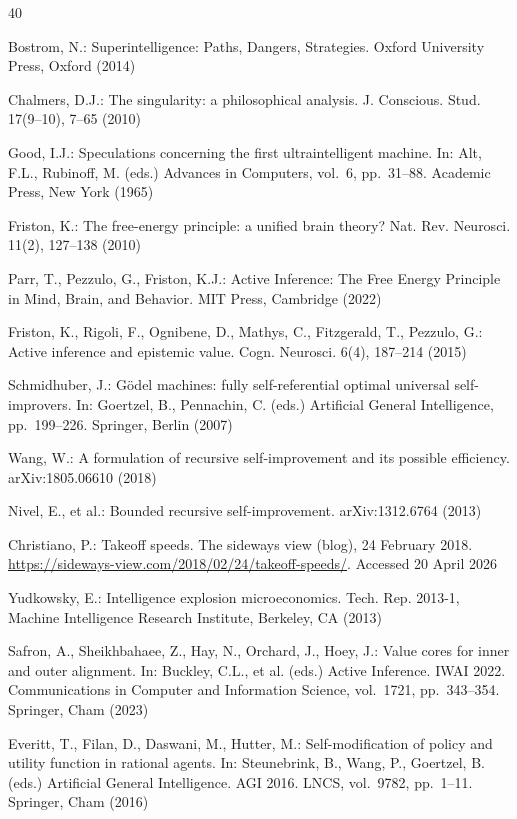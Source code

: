 \documentclass[runningheads]{llncs}
\begin{document}
\begin{thebibliography}{40}

Bostrom, N.: Superintelligence: Paths, Dangers, Strategies. Oxford University Press, Oxford (2014)

Chalmers, D.J.: The singularity: a philosophical analysis. J. Conscious. Stud. 17(9--10), 7--65 (2010)

Good, I.J.: Speculations concerning the first ultraintelligent machine. In: Alt, F.L., Rubinoff, M. (eds.) Advances in Computers, vol.~6, pp.~31--88. Academic Press, New York (1965)

Friston, K.: The free-energy principle: a unified brain theory? Nat. Rev. Neurosci. 11(2), 127--138 (2010)

Parr, T., Pezzulo, G., Friston, K.J.: Active Inference: The Free Energy Principle in Mind, Brain, and Behavior. MIT Press, Cambridge (2022)

Friston, K., Rigoli, F., Ognibene, D., Mathys, C., Fitzgerald, T., Pezzulo, G.: Active inference and epistemic value. Cogn. Neurosci. 6(4), 187--214 (2015)

Schmidhuber, J.: G\"odel machines: fully self-referential optimal universal self-improvers. In: Goertzel, B., Pennachin, C. (eds.) Artificial General Intelligence, pp.~199--226. Springer, Berlin (2007)

Wang, W.: A formulation of recursive self-improvement and its possible efficiency. arXiv:1805.06610 (2018)

Nivel, E., et al.: Bounded recursive self-improvement. arXiv:1312.6764 (2013)

Christiano, P.: Takeoff speeds. The sideways view (blog), 24 February 2018. \url{https://sideways-view.com/2018/02/24/takeoff-speeds/}. Accessed 20 April 2026

Yudkowsky, E.: Intelligence explosion microeconomics. Tech. Rep. 2013-1, Machine Intelligence Research Institute, Berkeley, CA (2013)

Safron, A., Sheikhbahaee, Z., Hay, N., Orchard, J., Hoey, J.: Value cores for inner and outer alignment. In: Buckley, C.L., et al. (eds.) Active Inference. IWAI 2022. Communications in Computer and Information Science, vol.~1721, pp.~343--354. Springer, Cham (2023)

Everitt, T., Filan, D., Daswani, M., Hutter, M.: Self-modification of policy and utility function in rational agents. In: Steunebrink, B., Wang, P., Goertzel, B. (eds.) Artificial General Intelligence. AGI 2016. LNCS, vol.~9782, pp.~1--11. Springer, Cham (2016)


\end{thebibliography}
\end{document}
